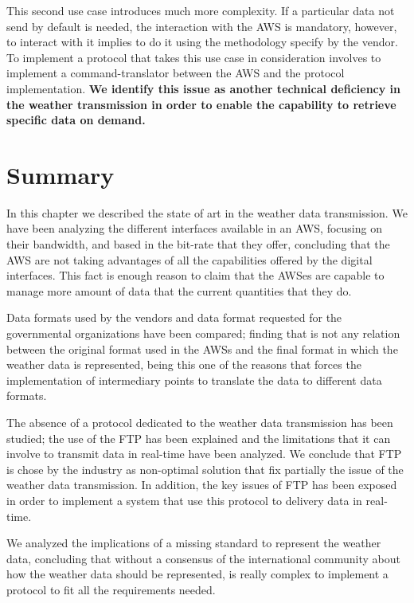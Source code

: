 This second use case introduces much more complexity. If a particular data not send by default is needed, the interaction with the \gls{AWS} is mandatory, however, to interact with it implies to do it using the methodology specify by the vendor. To implement a protocol that takes this use case in consideration involves to implement a command-translator between the \gls{AWS} and the protocol implementation. \textbf{We identify this issue as another technical deficiency in the weather transmission in order to enable the capability to retrieve specific data on demand.}
\section{Summary}

In this chapter we described the state of art in the weather data transmission. We have been analyzing the different interfaces available in an \gls{AWS}, focusing on their bandwidth, and based in the bit-rate that they offer, concluding that the \gls{AWS} are not taking advantages of all the capabilities offered by the digital interfaces. This fact is enough reason to claim that the \gls{AWS}es are capable to manage more amount of data that the current quantities that they do.

Data formats used by the vendors and data format requested for the governmental organizations have been compared; finding that is not any relation between the original format used in the \gls{AWS}s and the final format in which the weather data is represented, being this one of the reasons that forces the implementation of intermediary points to translate the data to different data formats.

The absence of a protocol dedicated to the weather data transmission has been studied; the use of the \gls{FTP} has been explained and the limitations that it can involve to transmit data in real-time have been analyzed. We conclude that  \gls{FTP} is chose by the industry as non-optimal solution that fix partially the issue of the weather data transmission. In addition, the key issues of \gls{FTP} has been exposed in order to implement a system that use this protocol to delivery data in real-time.

We analyzed the implications of a missing standard to represent the weather data, concluding that without a consensus of the international community about how the weather data  should be represented, is really complex to implement a protocol to fit all the requirements needed.

